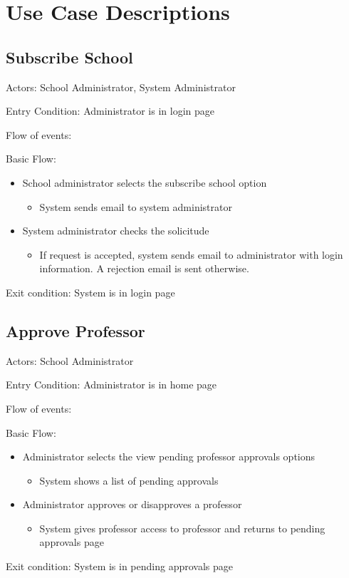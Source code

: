 \section{Use Case Descriptions}

\subsection*{Subscribe School}
Actors: School Administrator, System Administrator

Entry Condition: Administrator is in login page

Flow of events:

Basic Flow:

\begin{itemize}
\item School administrator selects the subscribe school option
\begin{itemize}
\item System sends email to system administrator
\end{itemize}
\item System administrator checks the solicitude
\begin{itemize}
\item If request is accepted, system sends email to administrator with 
login information. A rejection email is sent otherwise.
\end{itemize}
\end{itemize}
Exit condition: System is in login page

\subsection*{Approve Professor}
Actors: School Administrator

Entry Condition: Administrator is in home page

Flow of events:

Basic Flow:

\begin{itemize}
\item Administrator selects the view pending professor approvals options
\begin{itemize}
\item System shows a list of pending approvals
\end{itemize}
\item Administrator approves or disapproves a professor
\begin{itemize}
\item System gives professor access to professor and returns to 
pending approvals page
\end{itemize}
\end{itemize}
Exit condition: System is in pending approvals page



